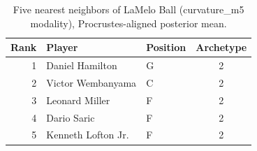 \begin{table}[htbp]
  \centering\small
  \begin{tabular}{rllc}
    \toprule
    Rank & Player & Position & Archetype \\
    \midrule
    1 & Daniel Hamilton & G & 2 \\
    2 & Victor Wembanyama & C & 2 \\
    3 & Leonard Miller & F & 2 \\
    4 & Dario Saric & F & 2 \\
    5 & Kenneth Lofton Jr. & F & 2 \\
    \bottomrule
  \end{tabular}
  \caption{Five nearest neighbors of LaMelo Ball (curvature_m5 modality), Procrustes-aligned posterior mean.}
  \label{tab:LaMelo_Ball_neighbors_curvature_m5}
\end{table}

